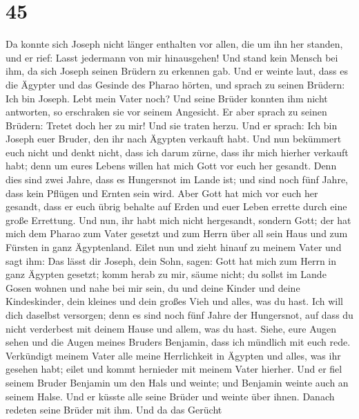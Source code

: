 \hypertarget{section-44}{%
\section{45}\label{section-44}}

 Da konnte sich Joseph nicht länger enthalten vor allen,
die um ihn her standen, und er rief: Lasst jedermann von mir
hinausgehen! Und stand kein Mensch bei ihm, da sich Joseph seinen
Brüdern zu erkennen gab.  Und er weinte laut, dass es die
Ägypter und das Gesinde des Pharao hörten,  und sprach zu
seinen Brüdern: Ich bin Joseph. Lebt mein Vater noch? Und seine Brüder
konnten ihm nicht antworten, so erschraken sie vor seinem Angesicht.
 Er aber sprach zu seinen Brüdern: Tretet doch her zu mir!
Und sie traten herzu. Und er sprach: Ich bin Joseph euer Bruder, den ihr
nach Ägypten verkauft habt.  Und nun bekümmert euch nicht
und denkt nicht, dass ich darum zürne, dass ihr mich hierher verkauft
habt; denn um eures Lebens willen hat mich Gott vor euch her gesandt.
 Denn dies sind zwei Jahre, dass es Hungersnot im Lande
ist; und sind noch fünf Jahre, dass kein Pflügen und Ernten sein wird.
 Aber Gott hat mich vor euch her gesandt, dass er euch
übrig behalte auf Erden und euer Leben errette durch eine große
Errettung.  Und nun, ihr habt mich nicht hergesandt,
sondern Gott; der hat mich dem Pharao zum Vater gesetzt und zum Herrn
über all sein Haus und zum Fürsten in ganz Ägyptenland. 
Eilet nun und zieht hinauf zu meinem Vater und sagt ihm: Das lässt dir
Joseph, dein Sohn, sagen: Gott hat mich zum Herrn in ganz Ägypten
gesetzt; komm herab zu mir, säume nicht;  du sollst im
Lande Gosen wohnen und nahe bei mir sein, du und deine Kinder und deine
Kindeskinder, dein kleines und dein großes Vieh und alles, was du hast.
 Ich will dich daselbst versorgen; denn es sind noch fünf
Jahre der Hungersnot, auf dass du nicht verderbest mit deinem Hause und
allem, was du hast.  Siehe, eure Augen sehen und die
Augen meines Bruders Benjamin, dass ich mündlich mit euch rede.
 Verkündigt meinem Vater alle meine Herrlichkeit in
Ägypten und alles, was ihr gesehen habt; eilet und kommt hernieder mit
meinem Vater hierher.  Und er fiel seinem Bruder Benjamin
um den Hals und weinte; und Benjamin weinte auch an seinem Halse.
 Und er küsste alle seine Brüder und weinte über ihnen.
Danach redeten seine Brüder mit ihm.  Und da das Gerücht
